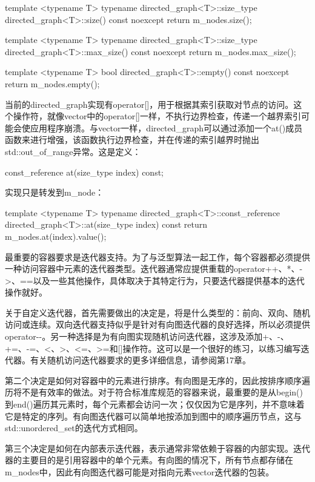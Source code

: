 \begin{cpp}
template <typename T>
typename directed_graph<T>::size_type directed_graph<T>::size() const noexcept
{
    return m_nodes.size();
}

template <typename T>
typename directed_graph<T>::size_type directed_graph<T>::max_size() const noexcept
{
    return m_nodes.max_size();
}

template <typename T>
bool directed_graph<T>::empty() const noexcept
{
    return m_nodes.empty();
}
\end{cpp}

当前的directed\_graph实现有operator[]，用于根据其索引获取对节点的访问。这个操作符，就像vector中的operator[]一样，不执行边界检查，传递一个越界索引可能会使应用程序崩溃。与vector一样，directed\_graph可以通过添加一个at()成员函数来进行增强，该函数执行边界检查，并在传递的索引越界时抛出std::out\_of\_range异常。这是定义：

\begin{cpp}
const_reference at(size_type index) const;
\end{cpp}

实现只是转发到m\_node：

\begin{cpp}
template <typename T>
typename directed_graph<T>::const_reference
    directed_graph<T>::at(size_type index) const
{
    return m_nodes.at(index).value();
}
\end{cpp}


最重要的容器要求是迭代器支持。为了与泛型算法一起工作，每个容器都必须提供一种访问容器中元素的迭代器类型。迭代器通常应提供重载的operator++、*、->、==以及一些其他操作，具体取决于其特定行为，只要迭代器提供基本的迭代操作就好。

关于自定义迭代器，首先需要做出的决定是，将是什么类型的：前向、双向、随机访问或连续。双向迭代器支持似乎是针对有向图迭代器的良好选择，所以必须提供operator-{}-。另一种选择是为有向图实现随机访问迭代器，这涉及添加+、-、+=、-=、<、>、<=、>=和[]操作符。这可以是一个很好的练习，以练习编写迭代器。有关随机访问迭代器要求的更多详细信息，请参阅第17章。

第二个决定是如何对容器中的元素进行排序。有向图是无序的，因此按排序顺序遍历将不是有效率的做法。对于符合标准库规范的容器来说，最重要的是从begin()到end()遍历其元素时，每个元素都会访问一次；仅仅因为它是序列，并不意味着它是特定的序列。有向图迭代器可以简单地按添加到图中的顺序遍历节点，这与std::unordered\_set的迭代方式相同。

第三个决定是如何在内部表示迭代器，表示通常非常依赖于容器的内部实现。迭代器的主要目的是引用容器中的单个元素。有向图的情况下，所有节点都存储在m\_nodes中，因此有向图迭代器可能是对指向元素vector迭代器的包装。

